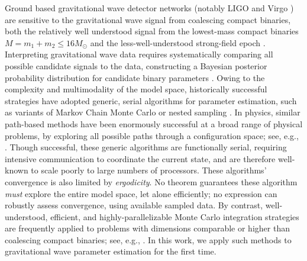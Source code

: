 \label{sec:introduction}

Ground based gravitational wave detector networks (notably LIGO \cite{gw-detectors-LIGO-original-preferred} and Virgo
\cite{gw-detectors-VIRGO-original-preferred})  are sensitive to the gravitational wave signal from coalescing compact
binaries, both the relatively well understood signal from  the lowest-mass compact binaries
$M=m_1+m_2\le 16 M_\odot$
\cite{2003PhRvD..67j4025B,2004PhRvD..70j4003B,2004PhRvD..70f4028D,BCV:PTF,2005PhRvD..71b4039K,2005PhRvD..72h4027B,2006PhRvD..73l4012K,2007MNRAS.374..721T,2008PhRvD..78j4007H,gr-astro-eccentric-NR-2008,gw-astro-mergers-approximations-SpinningPNHigherHarmonics,gw-astro-PN-Comparison-AlessandraSathya2009}
and the less-well-understood strong-field epoch
\cite{2011PhRvD..83l2005A,2009CQGra..26p5008A, 2014PhRvD..89d2002K,2009PhRvD..79l4028B,2010PhRvD..82f4016S,2011CQGra..28m4002M,2013PhRvD..87b4009M,2013CQGra..31b5012H}.    
%
Interpreting gravitational wave data requires systematically comparing all possible candidate signals to the data,
constructing a Bayesian posterior probability distribution for candidate binary parameters \citeMCMC{}.   
%
Owing to the complexity and multimodality of the model space, historically successful strategies have adopted  generic, serial
algorithms for parameter estimation, such as variants of Markov Chain Monte Carlo or nested sampling
\cite{2011RvMP...83..943V,gw-astro-PE-lalinference-v1}.   
%
In physics, similar path-based methods have been enormously successful at a broad range of physical problems, by
exploring all  possible paths  through a configuration space; see,
e.g.,  \cite{2001RvMP...73...33F,1987PhLB..195..216D}.  
Though successful, these generic algorithms are functionally serial, requiring intensive communication to coordinate the
current state, and are therefore well-known to scale poorly to large numbers of processors.  
%
These algorithms' convergence is also limited by \emph{ergodicity}.  
 No theorem  guarantees these algorithm \emph{must}  explore the entire model space, let alone efficiently; no expression can robustly assess convergence, using available
 sampled data.  
%
By contrast, well-understood, efficient, and highly-parallelizable Monte Carlo integration strategies are frequently applied to problems with dimensions comparable or
higher than coalescing compact binaries; see, e.g.,  \cite{lepage1980vegas,1980PhRvD..21.2308C,book-math-Jaeckel-MonteCarlo,mm-QuasiMonteCarlo-Papageorgiou2001}.    In this work, we apply such methods to gravitational wave
parameter estimation for the first time.  
%
%


